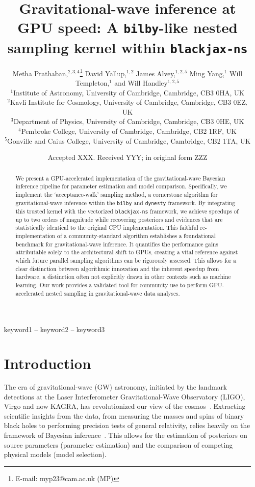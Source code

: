 \documentclass[fleqn,usenatbib]{mnras}
\title[GPU-accelerated nested sampling for gravitational waves]{Gravitational-wave inference at GPU speed: A \texttt{bilby}-like nested sampling kernel within \texttt{blackjax-ns}}
\author[Metha Prathaban et al.]{
Metha Prathaban,$^{2,3,4}$\thanks{E-mail: myp23@cam.ac.uk (MP)}
David Yallup,$^{1,2}$
James Alvey,$^{1,2,5}$
Ming Yang,$^{1}$
Will Templeton,$^{1}$
and Will Handley$^{1,2,5}$
\\
$^{1}$Institute of Astronomy, University of Cambridge, Cambridge, CB3 0HA, UK\\
$^{2}$Kavli Institute for Cosmology, University of Cambridge, Cambridge, CB3 0EZ, UK\\
$^{3}$Department of Physics, University of Cambridge, Cambridge, CB3 0HE, UK\\
$^{4}$Pembroke College, University of Cambridge, Cambridge, CB2 1RF, UK\\
$^{5}$Gonville and Caius College, University of Cambridge, Cambridge, CB2 1TA, UK\\
}
\date{Accepted XXX. Received YYY; in original form ZZZ}
\begin{document}
\label{firstpage}
\pagerange{\pageref{firstpage}--\pageref{lastpage}}
\maketitle

\begin{abstract}
We present a GPU-accelerated implementation of the gravitational-wave
Bayesian inference pipeline for parameter estimation and model comparison. 
Specifically, we implement the `acceptance-walk'
sampling method, a cornerstone algorithm for gravitational-wave
inference within the \texttt{bilby} and \texttt{dynesty} framework.
By integrating this trusted kernel with the vectorized \texttt{blackjax-ns}
framework, we achieve speedups of up to two orders of
magnitude while recovering posteriors and evidences that are
statistically identical to the original CPU implementation. This faithful
re-implementation of a community-standard algorithm establishes a foundational
benchmark for gravitational-wave inference. It quantifies the
performance gains attributable solely to the architectural shift to GPUs,
creating a vital reference against which future parallel 
sampling algorithms can be rigorously assessed. 
This allows for a clear distinction between algorithmic innovation 
and the inherent speedup from hardware, a distinction often not
explicitly drawn in other contexts such as machine learning.
Our work provides a validated tool for community use to perform
GPU-accelerated nested sampling in gravitational-wave data analyses.
\end{abstract}

\begin{keywords}
keyword1 -- keyword2 -- keyword3
\end{keywords}



\section{Introduction}


The era of gravitational-wave (GW) astronomy, initiated by the landmark
detections at the Laser Interferometer Gravitational-Wave Observatory (LIGO),
Virgo and now KAGRA, has revolutionized
our view of the cosmos~\citep{GW150914, GW170817,GWTC1,GWTC2, GWTC3,GWTC3_pop_analysis,GWTC2_GR,siren}. 
Extracting scientific insights from the data, from measuring the
masses and spins of binary black holes to performing precision tests of general
relativity, relies heavily on the framework of Bayesian inference~\citep{Thrane_2019}. 
This allows for the estimation of posteriors on source parameters
(parameter estimation) and the comparison of competing physical models (model selection).
\end{document}
